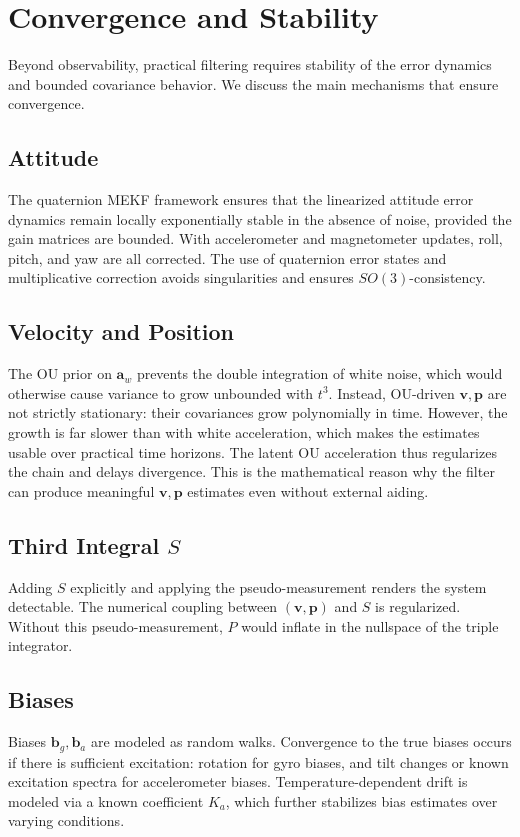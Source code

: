 \documentclass[10pt]{extarticle}
\begin{document}
\section{Convergence and Stability}
\label{sec:convergence}

Beyond observability, practical filtering requires stability of the error dynamics and
bounded covariance behavior. We discuss the main mechanisms that ensure convergence.

\subsection{Attitude}
The quaternion MEKF framework ensures that the linearized attitude error dynamics remain
locally exponentially stable in the absence of noise, provided the gain matrices are bounded.
With accelerometer and magnetometer updates, roll, pitch, and yaw are all corrected. The use
of quaternion error states and multiplicative correction avoids singularities and ensures
$SO(3)$-consistency.

\subsection{Velocity and Position}
The OU prior on $\bm a_w$ prevents the double integration of white noise, which would otherwise
cause variance to grow unbounded with $t^3$. Instead, OU-driven $\bm v,\bm p$ are not strictly stationary: their covariances grow polynomially in time. However, the growth is far slower than with white acceleration, which makes the estimates usable over practical time horizons. The latent OU acceleration thus regularizes the chain and delays divergence. This is the mathematical reason
why the filter can produce meaningful $\bm v,\bm p$ estimates even without external aiding.

\subsection{Third Integral $S$}
Adding $S$ explicitly and applying the pseudo-measurement renders the system detectable. The
numerical coupling between $(\bm v,\bm p)$ and $S$ is regularized. Without this pseudo-measurement, 
$P$ would inflate in the nullspace of the triple integrator.

\subsection{Biases}
Biases $\bm b_g,\bm b_a$ are modeled as random walks. Convergence to
the true biases occurs if there is sufficient excitation: rotation for gyro biases, and tilt
changes or known excitation spectra for accelerometer biases. Temperature-dependent drift is
modeled via a known coefficient $K_a$, which further stabilizes bias estimates over varying
conditions.
\end{document}
